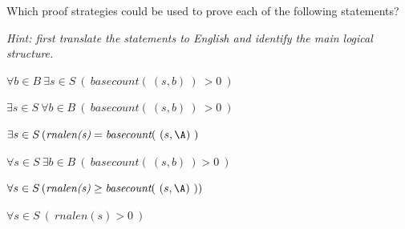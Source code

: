
Which proof strategies could be used to prove each of the following statements?

{\it Hint: first translate the statements to English and identify the main logical structure.}


$\forall b \in B~\exists s \in S~(~basecount(~(s,b)~)~ > 0~)$

\vfill

$\exists s \in S~\forall b \in B~(~basecount(~(s,b)~)~ > 0~)$

\vfill

$\exists s \in S \, (\textit{rnalen(s)} = \textit{basecount}(~(s, \A)~)$

\vfill

$\forall s \in S ~\exists b\in B ~(~basecount(~(s,b)~) > 0~)$

\vfill

$\forall s \in S \, (\textit{rnalen(s)} \geq \textit{basecount}(~(s, \A)~))$

\vfill

$\forall s \in S~(~rnalen(s) > 0~)$

\vfill
